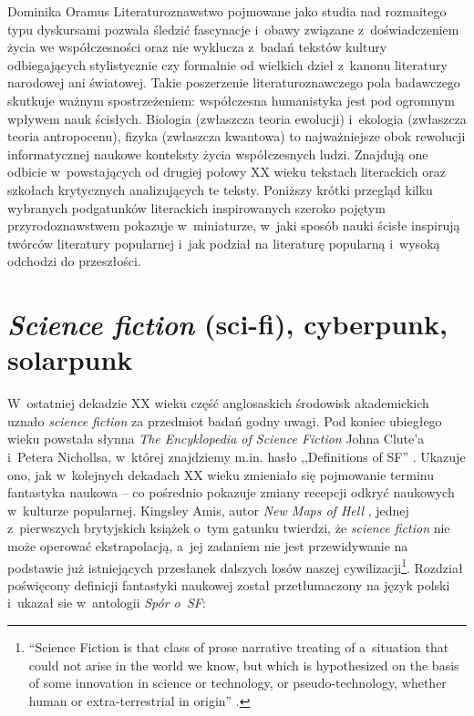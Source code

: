 \begin{artplenv}{Dominika Oramus}
\lettrine[loversize=0.13,lines=2,lraise=-0.01,nindent=0em,findent=0.2pt]%
{L}{}iteraturoznawstwo pojmowane jako studia nad rozmaitego typu dyskursami pozwala śledzić fascynacje i~obawy związane z~doświadczeniem życia we współczesności oraz nie wyklucza z~badań tekstów kultury odbiegających stylistycznie czy formalnie od wielkich dzieł z~kanonu literatury narodowej ani światowej. Takie poszerzenie literaturoznawczego pola badawczego skutkuje ważnym spostrzeżeniem: współczesna humanistyka jest pod ogromnym wpływem nauk ścisłych. Biologia (zwłaszcza teoria ewolucji) i~ekologia (zwłaszcza teoria antropocenu), fizyka (zwłaszcza kwantowa) to najważniejsze obok rewolucji informatycznej naukowe konteksty życia współczesnych ludzi. Znajdują one odbicie w~powstających od drugiej połowy XX wieku tekstach literackich oraz szkołach krytycznych analizujących te teksty. Poniższy krótki przegląd kilku wybranych podgatunków literackich inspirowanych szeroko pojętym przyrodoznawstwem pokazuje w~miniaturze, w~jaki sposób nauki ścisłe inspirują twórców literatury popularnej i~jak podział na literaturę popularną i~wysoką odchodzi do przeszłości.

\section*{\textit{Science fiction} (sci-fi), cyberpunk, solarpunk}
W~ostatniej dekadzie XX wieku część anglosaskich środowisk akademickich uznało \textit{science fiction} za przedmiot badań godny uwagi. Pod koniec ubiegłego wieku powstała słynna \textit{The Encyklopedia of Science Fiction} Johna Clute’a i~Petera Nichollsa, w~której znajdziemy m.in. hasło ,,Definitions of SF''
\parencite[][s.~311–314]{clute_encyclopedia_1993}. %
 Ukazuje ono, jak w~kolejnych dekadach XX wieku zmieniało się pojmowanie terminu fantastyka naukowa -- co pośrednio pokazuje zmiany recepcji odkryć naukowych w~kulturze popularnej. Kingsley Amis, autor \textit{New Maps of Hell} 
\parencite*[][]{amis_new_1960}, %
 jednej z~pierwszych brytyjskich książek o~tym gatunku twierdzi, że \textit{science fiction} nie może operować ekstrapolacją, a~jej zadaniem nie jest przewidywanie na podstawie już istniejących przesłanek dalszych losów naszej cywilizacji\footnote{“Science Fiction is that class of prose narrative treating of a~situation that could not arise in the world we know, but which is hypothesized on the basis of some innovation in science or technology, or pseudo-technology, whether human or extra-terrestrial in origin'' 
\parencite[][s.~14]{amis_new_1960}.%
}. Rozdział poświęcony definicji fantastyki naukowej został przetłumaczony na język polski i~ukazał sie w~antologii \textit{Spór o~SF}:


\end{artplenv}
